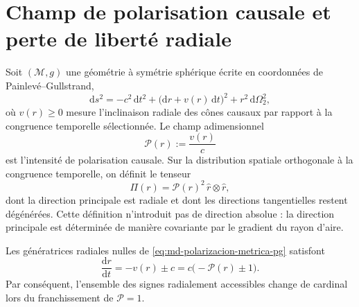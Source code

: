 
\section{Champ de polarisation causale et perte de liberté radiale}
\label{sec:md-polarizacion-causal-definicion}

Soit \((\mathcal M,g)\) une géométrie à symétrie sphérique écrite en
coordonnées de Painlevé--Gullstrand,
\begin{equation}
 \mathrm ds^2
 =-c^2\,\mathrm dt^2
  +\bigl(\mathrm dr+v(r)\,\mathrm dt\bigr)^2
  +r^2\,\mathrm d\Omega_2^2,
 \label{eq:md-polarizacion-metrica-pg}
\end{equation}
où \(v(r)\geq0\) mesure l'inclinaison radiale des cônes causaux par rapport
à la congruence temporelle sélectionnée. Le champ adimensionnel
\begin{equation}
 \mathcal P(r):=\frac{v(r)}{c}
 \label{eq:md-polarizacion-parametro}
\end{equation}
est l'intensité de polarisation causale. Sur la distribution spatiale
orthogonale à la congruence temporelle, on définit le tenseur
\begin{equation}
 \Pi(r)=\mathcal P(r)^2\,\widehat r\otimes\widehat r,
 \label{eq:md-polarizacion-tensor}
\end{equation}
dont la direction principale est radiale et dont les directions tangentielles
restent dégénérées. Cette définition n'introduit pas de direction absolue :
la direction principale est déterminée de manière covariante par le gradient du
rayon d'aire.

Les génératrices radiales nulles de \eqref{eq:md-polarizacion-metrica-pg}
satisfont
\begin{equation}
 \frac{\mathrm dr}{\mathrm dt}=-v(r)\pm c
 =c\bigl(-\mathcal P(r)\pm1\bigr).
 \label{eq:md-polarizacion-generatrices}
\end{equation}
Par conséquent, l'ensemble des signes radialement accessibles change de cardinal
lors du franchissement de \(\mathcal P=1\).

